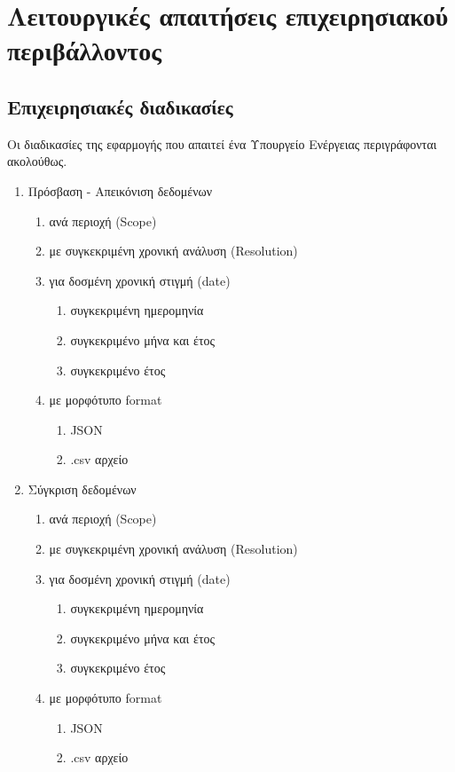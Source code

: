 \documentclass[a4paper,12pt, oneside]{article}
\begin{document}
\section{Λειτουργικές απαιτήσεις επιχειρησιακού περιβάλλοντος}
\subsection{Επιχειρησιακές διαδικασίες}
Οι διαδικασίες της εφαρμογής που απαιτεί ένα Υπουργείο Ενέργειας περιγράφονται ακολούθως.
\renewcommand{\theenumi}{\Roman{enumi}}
\renewcommand{\theenumii}{\arabic{enumii}}
\renewcommand{\theenumiii}{\alph{enumiii}}

\begin{enumerate}
   \item Πρόσβαση - Απεικόνιση δεδομένων
      \begin{enumerate}
     \item ανά περιοχή \textlatin{(Scope)}
     \item με συγκεκριμένη χρονική ανάλυση \textlatin{(Resolution)}
     \item για δοσμένη χρονική στιγμή \textlatin{(date)}
     \begin{enumerate}
  	\item συγκεκριμένη ημερομηνία
   	\item συγκεκριμένο μήνα και έτος	   	
	\item συγκεκριμένο έτος
     \end{enumerate}
     \item με μορφότυπο \textlatin{format}
     \begin{enumerate}
  	\item \textlatin{JSON}
   	\item \textlatin{.csv} αρχείο
     \end{enumerate}
   \end{enumerate}
   \item Σύγκριση δεδομένων
       \begin{enumerate}
     \item ανά περιοχή \textlatin{(Scope)}
     \item με συγκεκριμένη χρονική ανάλυση \textlatin{(Resolution)}
     \item για δοσμένη χρονική στιγμή \textlatin{(date)}
     \begin{enumerate}
  	\item συγκεκριμένη ημερομηνία
   	\item συγκεκριμένο μήνα και έτος	   	
	\item συγκεκριμένο έτος
     \end{enumerate}
     \item με μορφότυπο \textlatin{format}
     \begin{enumerate}
  	\item \textlatin{JSON}
   	\item \textlatin{.csv} αρχείο
     \end{enumerate}
   \end{enumerate}


\end{enumerate}
\end{document}
